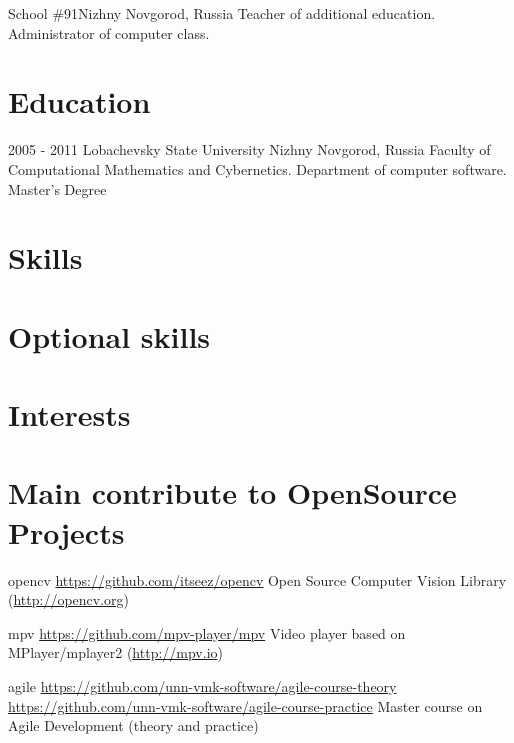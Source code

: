 \documentclass[11pt,a4paper]{moderncv}
\begin{document}
	{School \#91}{Nizhny Novgorod, Russia}{}{}
	{Teacher of additional education. Administrator of computer class.}

\section{Education}
  \cventry
    {2005 - 2011}
    {Lobachevsky State University}
    {Nizhny Novgorod, Russia}
    {}{}
    {Faculty of Computational Mathematics and Cybernetics. Department of computer software.\newline{}
    Master's Degree}


\section{Skills}

\section{Optional skills}

\section{Interests}


\section{Main contribute to OpenSource Projects}
\cvline
  {opencv}
  {\url{https://github.com/itseez/opencv}\newline{}
  Open Source Computer Vision Library (\url{http://opencv.org})}

\cvline
  {mpv}
  {\url{https://github.com/mpv-player/mpv}\newline{}
  Video player based on MPlayer/mplayer2 (\url{http://mpv.io})}

\cvline
  {agile}
  {
  \url{https://github.com/unn-vmk-software/agile-course-theory}\newline{}
  \url{https://github.com/unn-vmk-software/agile-course-practice}\newline{}
  Master course on Agile Development (theory and practice)
  }
\end{document}
